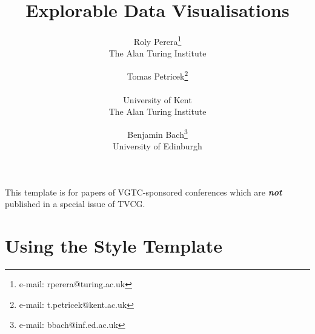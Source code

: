 \documentclass{vgtc}                          %
\title{Explorable Data Visualisations}
\author{Roly Perera\thanks{e-mail: rperera@turing.ac.uk}\\ %
        \scriptsize The Alan Turing Institute %
\and Tomas Petricek\thanks{e-mail: t.petricek@kent.ac.uk}\\ %
     \parbox{1.4in}{\scriptsize \centering University of Kent \\ The Alan Turing Institute} %
\and Benjamin Bach\thanks{e-mail: bbach@inf.ed.ac.uk}\\ %
     \scriptsize \centering University of Edinburgh}
\begin{document}


\maketitle

This template is for papers of VGTC-sponsored conferences which are \emph{\textbf{not}} published in a special issue of TVCG.

\section{Using the Style Template}
\end{document}
